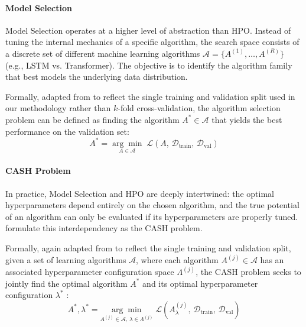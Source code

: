 \paragraph{Model Selection}
Model Selection operates at a higher level of abstraction than \ac{HPO}. Instead of tuning the internal mechanics of a specific algorithm, the search space consists of a discrete set of different machine learning algorithms $\mathcal{A} = \{A^{(1)}, \dots, A^{(R)}\}$ (e.g., \ac{LSTM} vs. Transformer). The objective is to identify the algorithm family that best models the underlying data distribution. 


Formally, adapted from \textcite{AutoMLHoos} to reflect the single training and validation split used in our methodology rather than $k$-fold cross-validation, the algorithm selection problem can be defined as finding the algorithm $A^* \in \mathcal{A}$ that yields the best performance on the validation set:
\begin{equation}
    A^* = \underset{A \in \mathcal{A}}{\arg\min}\;
    \mathcal{L}\!\left(A,\, \mathcal{D}_\text{train},\,
    \mathcal{D}_\text{val}\right)
    \label{eq:model_selection}
\end{equation}

\paragraph{CASH Problem}
In practice, Model Selection and \ac{HPO} are deeply intertwined: the optimal hyperparameters depend entirely on the chosen algorithm, and the true potential of an algorithm can only be evaluated if its hyperparameters are properly tuned. \textcite{hutter2019automated} formulate this interdependency as the \acf{CASH} problem.%

Formally, again adapted from \textcite{AutoMLHoos} to reflect the single training and validation split, given a set of learning algorithms $\mathcal{A}$, where each algorithm $A^{(j)} \in \mathcal{A}$ has an associated hyperparameter configuration space $\Lambda^{(j)}$, the \ac{CASH} problem seeks to jointly find the optimal algorithm $A^*$ and its optimal hyperparameter configuration $\lambda^*$ \parencite{AutoMLHoos}:
\begin{equation}
    A^*, \lambda^* = \underset{A^{(j)} \in \mathcal{A},\, \lambda \in \Lambda^{(j)}}{\arg\min}\;
    \mathcal{L}\!\left(A^{(j)}_\lambda,\, \mathcal{D}_\text{train},\,
    \mathcal{D}_\text{val}\right)
    \label{eq:cash}
\end{equation}

